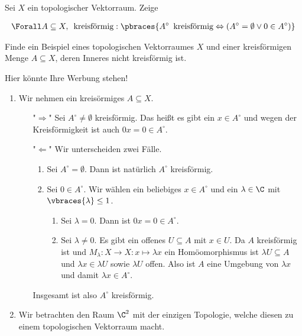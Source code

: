 \begin{exercise}

Sei $X$ ein topologischer Vektorraum.
Zeige

\begin{align*}
  \Forall A \subseteq X, \enspace \text{kreisförmig}:
  \pbraces
  {
    A^\circ \enspace \text{kreisförmig}
    \Leftrightarrow
    (A^\circ = \emptyset \lor 0 \in A^\circ)
  }
\end{align*}

Finde ein Beispiel eines topologischen Vektorraumes $X$ und einer kreisförmigen Menge $A \subseteq X$, deren
Inneres nicht kreisförmig ist.

\end{exercise}

\begin{solution}
Hier könnte Ihre Werbung stehen!
\begin{enumerate}[label = (\roman*)]
  \item Wir nehmen ein kreisörmiges $A \subseteq X$. 
  \begin{enumerate}
    \item["$\Rightarrow$"] Sei $A^\circ \neq \emptyset$ kreisförmig. Das heißt es gibt ein $x \in A^\circ$ und wegen der Kreisförmigkeit ist auch $0x = 0 \in A^\circ$.
    \item["$\Leftarrow$"]  Wir unterscheiden zwei Fälle.
    \begin{enumerate}[label = Fall \arabic*:]
      \item Sei $A^\circ = \emptyset$. Dann ist natürlich $A^\circ$ kreisförmig.
      \item Sei $0 \in A^\circ$. Wir wählen ein beliebiges $x \in A^\circ$ und ein $\lambda \in \C$ mit $\vbraces{\lambda} \leq 1$.
      \begin{enumerate}[label = Fall 2.\arabic*:]
        \item Sei $\lambda = 0$. Dann ist $0x = 0 \in A^\circ$. 
        \item Sei $\lambda \neq 0$. Es gibt ein offenes $U \subseteq A$ mit $x \in U$. Da $A$ kreisförmig ist und $M_\lambda: X \to X : x \mapsto \lambda x$ ein Homöomorphismus ist $\lambda U \subseteq A$ und $\lambda x \in \lambda U$ sowie $\lambda U$ offen. Also ist $A$ eine Umgebung von $\lambda x$ und damit $\lambda x \in A^\circ$.
      \end{enumerate} 
    \end{enumerate}
    Insgesamt ist also $A^\circ$ kreisförmig.
  \end{enumerate}
  \item Wir betrachten den Raum $\C^2$ mit der einzigen Topologie, welche diesen zu einem topologischen Vektorraum macht. 

\end{enumerate}
\end{solution}
